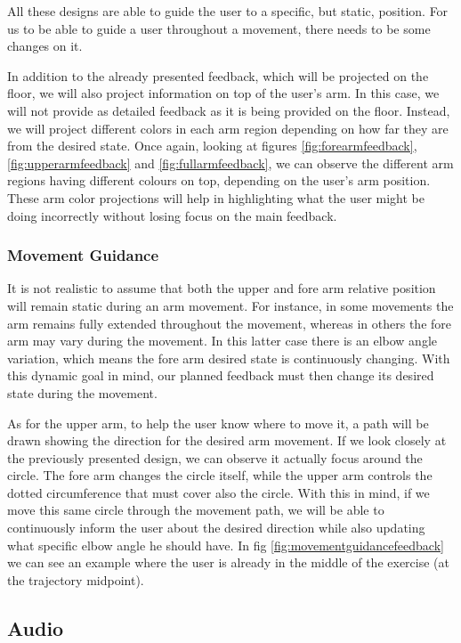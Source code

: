 All these designs are able to guide the user to a specific, but static, position. For us to be able to guide a user throughout a movement, there needs to be some changes on it.

In addition to the already presented feedback, which will be projected on the floor, we will also project information on top of the user's arm. 
In this case, we will not provide as detailed feedback as it is being provided on the floor. 
Instead, we will project different colors in each arm region depending on how far they are from the desired state. 
Once again, looking at figures \ref{fig:forearmfeedback}, \ref{fig:upperarmfeedback} and \ref{fig:fullarmfeedback}, we can observe the 
different arm regions having different colours on top, depending on the user's arm position.
These arm color projections will help in highlighting what the user might be doing incorrectly without losing focus on the main feedback.

\subsubsection{Movement Guidance}
\label{sec:movementguidance}

It is not realistic to assume that both the upper and fore arm relative position will remain static during an arm movement. 
For instance, in some movements the arm remains fully extended throughout the movement, whereas in others the fore arm may vary during the movement.  
In this latter case there is an elbow angle variation, which means the fore arm desired state is continuously changing.
With this dynamic goal in mind, our planned feedback must then change its desired state during the movement.

As for the upper arm, to help the user know where to move it, a path will be drawn showing the direction for the desired arm movement.
If we look closely at the previously presented design, we can observe it actually focus around the circle. 
The fore arm changes the circle itself, while the upper arm controls the dotted circumference that must cover also the circle. 
With this in mind, if we move this same circle through the movement path, we will be able to continuously inform the user about the 
desired direction while also updating what specific elbow angle he should have. 
In fig \ref{fig:movementguidancefeedback} we can see an example where the user is already in the middle of the exercise (at the trajectory midpoint).

\subsection{Audio}
\label{audio-feedback}

